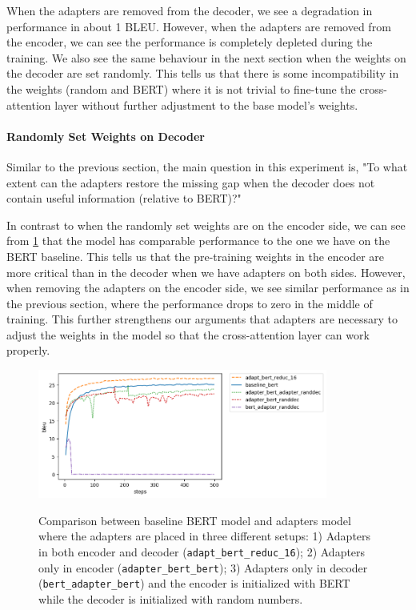 When the adapters are removed from the decoder, we see a degradation in performance in about 1 BLEU. However, when the adapters are removed from the encoder, we can see the performance is completely depleted during the training. We also see the same behaviour in the next section when the weights on the decoder are set randomly. This tells us that there is some incompatibility in the weights (random and BERT) where it is not trivial to fine-tune the cross-attention layer without further adjustment to the base model's weights.

\paragraph{Randomly Set Weights on Decoder}
Similar to the previous section, the main question in this experiment is, "To what extent can the adapters restore the missing gap when the decoder does not contain useful information (relative to BERT)?"

In contrast to when the randomly set weights are on the encoder side, we can see from \cref{img:adapt_bert_randdec} that the model has comparable performance to the one we have on the BERT baseline. This tells us that the pre-training weights in the encoder are more critical than in the decoder when we have adapters on both sides. However, when removing the adapters on the encoder side, we see similar performance as in the previous section, where the performance drops to zero in the middle of training. This further strengthens our arguments that adapters are necessary to adjust the weights in the model so that the cross-attention layer can work properly.

\begin{figure}[h]
    {\includegraphics[width=0.85\textwidth]{img/adapter_bert_randdec.png}}
    \centering
    \caption[Comparison for model with adapters in the decoder and the decoder is initalized with random weights]{Comparison between baseline BERT model and adapters model where the adapters are placed in three different setups: 1) Adapters in both encoder and decoder (\texttt{adapt\_bert\_reduc\_16}); 2) Adapters only in encoder (\texttt{adapter\_bert\_bert}); 3) Adapters only in decoder (\texttt{bert\_adapter\_bert}) and the encoder is initialized with BERT while the decoder is initialized with random numbers.}
    \label{img:adapt_bert_randdec}
\end{figure}

